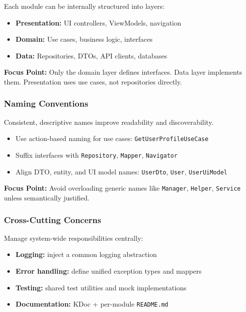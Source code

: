 \documentclass[a4paper,12pt]{article}
\begin{document}
Each module can be internally structured into layers:

\begin{itemize}
  \item \textbf{Presentation:} UI controllers, ViewModels, navigation
  \item \textbf{Domain:} Use cases, business logic, interfaces
  \item \textbf{Data:} Repositories, DTOs, API clients, databases
\end{itemize}

\textbf{Focus Point:} Only the domain layer defines interfaces. Data layer implements them. Presentation uses use cases, not repositories directly.

\subsubsection{Naming Conventions}

Consistent, descriptive names improve readability and discoverability.

\begin{itemize}
  \item Use action-based naming for use cases: \texttt{GetUserProfileUseCase}
  \item Suffix interfaces with \texttt{Repository}, \texttt{Mapper}, \texttt{Navigator}
  \item Align DTO, entity, and UI model names: \texttt{UserDto}, \texttt{User}, \texttt{UserUiModel}
\end{itemize}

\textbf{Focus Point:} Avoid overloading generic names like \texttt{Manager}, \texttt{Helper}, \texttt{Service} unless semantically justified.

\subsubsection{Cross-Cutting Concerns}

Manage system-wide responsibilities centrally:

\begin{itemize}
  \item \textbf{Logging:} inject a common logging abstraction
  \item \textbf{Error handling:} define unified exception types and mappers
  \item \textbf{Testing:} shared test utilities and mock implementations
  \item \textbf{Documentation:} KDoc + per-module \texttt{README.md}
\end{itemize}
\end{document}
